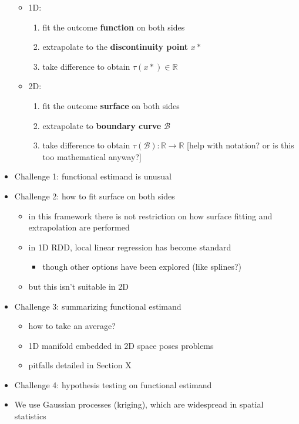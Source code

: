 \documentclass[letter]{article}
\providecommand{\tightlist}{%
      \setlength{\itemsep}{0pt}\setlength{\parskip}{0pt}}
\newcommand{\boundary}{\mathcal{B}}
\providecommand{\tightlist}{%
  	  \setlength{\itemsep}{0pt}\setlength{\parskip}{0pt}}
\begin{document}
\begin{itemize}
  \begin{itemize}
  \tightlist
  \item
    1D:

    \begin{enumerate}
    \def\labelenumi{\arabic{enumi}.}
    \tightlist
    \item
      fit the outcome \textbf{function} on both sides
    \item
      extrapolate to the \textbf{discontinuity point} \(x*\)
    \item
      take difference to obtain \(\tau(x*) \in \mathbb{R}\)
    \end{enumerate}
  \item
    2D:

    \begin{enumerate}
    \def\labelenumi{\arabic{enumi}.}
    \tightlist
    \item
      fit the outcome \textbf{surface} on both sides
    \item
      extrapolate to \textbf{boundary curve} \(\boundary\)
    \item
      take difference to obtain \(\tau(\boundary): \mathbb{R} \rightarrow \mathbb{R}\) {[}help with notation? or is this too mathematical anyway?{]}
    \end{enumerate}
  \end{itemize}
\item
  Challenge 1: functional estimand is unusual
\item
  Challenge 2: how to fit surface on both sides

  \begin{itemize}
  \tightlist
  \item
    in this framework there is not restriction on how surface fitting and extrapolation are performed
  \item
    in 1D RDD, local linear regression has become standard

    \begin{itemize}
    \tightlist
    \item
      though other options have been explored (like splines?)
    \end{itemize}
  \item
    but this isn't suitable in 2D
  \end{itemize}
\item
  Challenge 3: summarizing functional estimand

  \begin{itemize}
  \tightlist
  \item
    how to take an average?
  \item
    1D manifold embedded in 2D space poses problems
  \item
    pitfalls detailed in Section X
  \end{itemize}
\item
  Challenge 4: hypothesis testing on functional estimand
\item
  We use Gaussian processes (kriging), which are widespread in spatial statistics


\end{itemize}
\end{document}
